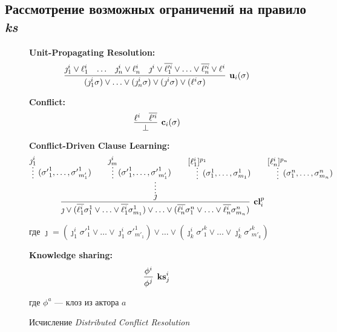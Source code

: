 \subsection{Рассмотрение возможных ограничений на правило \emph{ks}}
\label{sec:restr}

\begin{figure}\begin{calculus}\centering

\textbf{Unit-Propagating Resolution:}
$$
\infer[\upr{i}{\sigma}]
	  {(\jmath_1^i \sigma) \vee \ldots \vee (\jmath_n^i \sigma) \vee 
       (\jmath^i \sigma) \vee (\ell^i \sigma)}
      {\jmath_1^i \vee \ell^i_1 & \ldots & 
       \jmath_n^i \vee \ell^i_n & 
       \jmath^i \vee 
       \overline{\ell'^i_1} \vee \ldots \vee \overline{\ell'^i_n} \vee \ell^i
      }
$$

\bigskip

\textbf{Conflict:}
$$
\infer[\confl{i}{\sigma}]
      {\bot}
      {\ell^i & \overline{\ell'^i}}
$$ 

\bigskip

\textbf{Conflict-Driven Clause Learning:} \\

$$
\infer[\cdcl{i}{p}]
      { \jmath \vee (\overline{\ell^i_1} \sigma^1_1 \vee \ldots \vee \overline{\ell^i_1} \sigma^1_{m_1}) \vee \ldots \vee (\overline{\ell^i_n} \sigma^n_1 \vee \ldots \vee \overline{\ell^i_n} \sigma^n_{m_n})
      }
	  { \infer*{\jmath}
               { \infer*[({\sigma'}_1^1,\ldots,{\sigma'}_{m'_1}^1)]
                      {}{\jmath^i_1} &  &
                 \infer*[({\sigma'}_1^1,\ldots,{\sigma'}_{m'_1}^1)]
                      {}{\jmath^i_m} &  &
                 \infer*[(\sigma_1^1,\ldots,\sigma_{m_1}^1)]
                      {}{[\ell^i_1]^{\dls{p}{1} } } &  &
                 \infer*[(\sigma_1^n,\ldots,\sigma_{m_n}^n)]
                      {}{[\ell^i_n]^{\dls{p}{n}}}
               }
      }
$$ 

где $\jmath = ({\jmath^i_1} \sigma'^1_1 \vee \ldots \vee \jmath^i_1 \sigma'^1_{m'_1}) \vee \ldots \vee ({\jmath^i_k} \sigma'^k_1 \vee \ldots \vee \jmath^i_k\sigma'^k_{m'_k})$

\bigskip

\textbf{Knowledge sharing:} \\

$$
\infer[\kshare{i}{j}]
      {\phi^j}
	  {\phi^i}
$$

где $\phi^a$ --- клоз из актора $a$

\end{calculus}

\caption{Исчисление \emph{Distributed Conflict Resolution}}

\label{fig:DCR}
\end{figure}


